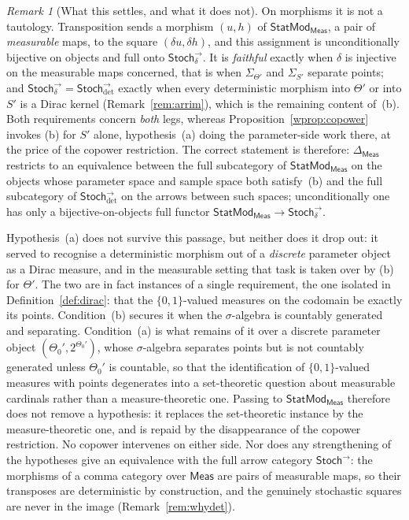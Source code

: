 \documentclass[11pt,a4paper]{article}
\theoremstyle{plain}
\theoremstyle{definition}
\theoremstyle{remark}
\newtheorem{caveat}[theorem]{Remark}
\newcommand{\cat}[1]{\mathsf{#1}}
\newcommand{\Meas}{\cat{Meas}}
\newcommand{\Stoch}{\cat{Stoch}}
\newcommand{\del}{\delta}
\newcommand{\StatMod}{\cat{StatMod}}
\newcommand{\Statk}{\StatMod_{\Meas}}
\newcommand{\Jcm}{\Delta_{\Meas}}
\newcommand{\Arrdet}[1]{#1^{\rightarrow}_{\det}}
\newcommand{\Arrim}[1]{#1^{\rightarrow}_{\del}}
\begin{document}
\begin{caveat}[What this settles, and what it does not]
On morphisms it is not a tautology. Transposition sends a morphism $(u,h)$ of $\Statk$, a pair of
\emph{measurable} maps, to the square $(\del u, \del h)$, and this
assignment is unconditionally bijective on objects and full onto
$\Arrim{\Stoch}$. It is \emph{faithful} exactly when $\del$ is injective on
the measurable maps concerned, that is when $\Sigma_{\Theta'}$ and
$\Sigma_{S'}$ separate points; and $\Arrim{\Stoch} = \Arrdet{\Stoch}$ exactly
when every deterministic morphism into $\Theta'$ or into $S'$ is a Dirac
kernel (Remark~\ref{rem:arrim}), which is the remaining content of~(b). Both
requirements concern
\emph{both} legs, whereas Proposition~\ref{wprop:copower} invokes (b) for $S'$
alone, hypothesis~(a) doing the parameter-side work there, at the price of
the copower restriction. The correct statement is therefore: $\Jcm$
restricts to an equivalence between the full subcategory of $\Statk$ on the
objects whose parameter space and sample space both satisfy~(b) and the full
subcategory of $\Arrdet{\Stoch}$ on the arrows between such spaces;
unconditionally one has only a bijective-on-objects full functor
$\Statk \to \Arrim{\Stoch}$.

Hypothesis~(a) does not survive this passage, but neither does it drop
out: it served to recognise a deterministic morphism out of a \emph{discrete}
parameter object as a Dirac measure, and in the measurable setting that task
is taken over by (b) for $\Theta'$. The two are in fact instances of a single
requirement, the one isolated in Definition~\ref{def:dirac}: that the
$\{0,1\}$-valued measures on the codomain be exactly its points. Condition~(b)
secures it when the $\sigma$-algebra is countably generated and separating.
Condition~(a) is what remains of it over a discrete parameter object
$(\Theta_{0}', 2^{\Theta_{0}'})$, whose $\sigma$-algebra separates points but
is not countably generated unless $\Theta_{0}'$ is countable, so that the
identification of $\{0,1\}$-valued measures with points degenerates into a
set-theoretic question about measurable cardinals rather than a
measure-theoretic one. Passing to $\Statk$ therefore does not remove a
hypothesis: it replaces the set-theoretic instance by the measure-theoretic
one, and is repaid by the disappearance of the copower restriction. No copower
intervenes on either side. Nor
does any strengthening of the hypotheses give an equivalence with the full
arrow category $\Stoch^{\rightarrow}$: the morphisms of a comma category over
$\Meas$ are pairs of measurable maps, so their transposes are deterministic by
construction, and the genuinely stochastic squares are never in the image
(Remark~\ref{rem:whydet}).


\end{caveat}
\end{document}
